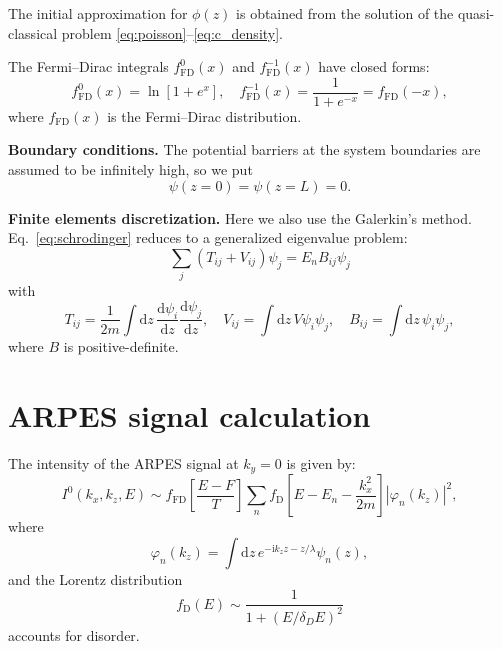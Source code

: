 \documentclass[10pt]{article}
\newcommand{\dd}{\mathrm{d}}
\newcommand{\fFD}{f_{\mathrm{FD}}}
\newcommand{\ii}{\mathrm{i}}
\newcommand{\abs}[1]{\left\lvert#1\right\rvert}
\begin{document}
The initial approximation for $\phi(z)$ is obtained from the solution of the
quasi-classical problem \eqref{eq:poisson}--\eqref{eq:c_density}.

The Fermi--Dirac integrals $\fFD^0(x)$ and $\fFD^{-1}(x)$ have closed forms:
\begin{equation}
	\fFD^0(x) = \ln[ 1 + e^x ], \quad
	\fFD^{-1}(x) = \frac{1}{1 + e^{-x}} = f_{\mathrm{FD}}(-x),
\end{equation}
where $f_{\mathrm{FD}}(x)$ is the Fermi--Dirac distribution.

\textbf{Boundary conditions.} The potential barriers at the system
boundaries are assumed to be infinitely high, so we put
\begin{equation}
	\psi(z = 0) = \psi(z = L) = 0.
\end{equation}

\textbf{Finite elements discretization.} Here we also use the Galerkin's
method. Eq.~\eqref{eq:schrodinger} reduces to a generalized eigenvalue problem:
\begin{equation}
	\sum_j \left( T_{ij} + V_{ij} \right) \psi_j = E_n B_{ij} \psi_j
\end{equation}
with
\begin{equation}
	T_{ij} = \frac{1}{2m }\int \dd z \, \frac{\dd \psi_i}{\dd z}
		\frac{\dd \psi_j}{\dd z}, \quad
	V_{ij} = \int \dd z \, V \psi_i \psi_j, \quad
	B_{ij} = \int \dd z \,\psi_i \psi_j,
\end{equation}
where $B$ is positive-definite.

\section{ARPES signal calculation}

The intensity of the ARPES signal at $k_y = 0$ is given by:
\begin{equation}
	I^0(k_x, k_z, E) \sim f_{\mathrm{FD}}\left[ \frac{E - F}{T} \right]
		\sum_n f_{\mathrm{D}}\left[ E - E_n - \frac{k_x^2}{2m} \right]
		\abs{\varphi_n(k_z)}^2,
\end{equation}
where
\begin{equation}
	\varphi_n(k_z) = \int \dd z \, e^{-\ii k_z z - z / \lambda} \psi_n(z),
\end{equation}
and the Lorentz distribution
\begin{equation}
	f_{\mathrm{D}}(E) \sim \frac{1}{1 + (E / \delta_D E)^2}
\end{equation}
accounts for disorder.
\end{document}
